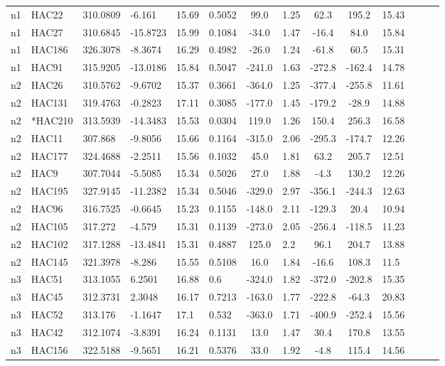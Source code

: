 \documentclass[useAMS,usenatbib]{mn2e}
\begin{document}
\begin{table*}
\begin{minipage}{150mm}
\begin{tabular}{@{}llllllclccllll@{}}
n1 & HAC22 & 310.0809 & -6.161 & 15.69 & 0.5052 & 99.0 & 1.25 & 62.3 & 195.2 & 15.43 \\
n1 & HAC27 & 310.6845 & -15.8723 & 15.99 & 0.1084 & -34.0 & 1.47 & -16.4 & 84.0 & 15.84 \\
n1 & HAC186 & 326.3078 & -8.3674 & 16.29 & 0.4982 & -26.0 & 1.24 & -61.8 & 60.5 & 15.31 \\
n1 & HAC91 & 315.9205 & -13.0186 & 15.84 & 0.5047 & -241.0 & 1.63 & -272.8 & -162.4 & 14.78 \\
n2 & HAC26 & 310.5762 & -9.6702 & 15.37 & 0.3661 & -364.0 & 1.25 & -377.4 & -255.8 & 11.61 \\
n2 & HAC131 & 319.4763 & -0.2823 & 17.11 & 0.3085 & -177.0 & 1.45 & -179.2 & -28.9 & 14.88 \\
n2 & *HAC210 & 313.5939 & -14.3483 & 15.53 & 0.0304 & 119.0 & 1.26 & 150.4 & 256.3 & 16.58 \\
n2 & HAC11 & 307.868 & -9.8056 & 15.66 & 0.1164 & -315.0 & 2.06 & -295.3 & -174.7 & 12.26 \\
n2 & HAC177 & 324.4688 & -2.2511 & 15.56 & 0.1032 & 45.0 & 1.81 & 63.2 & 205.7 & 12.51 \\
n2 & HAC9 & 307.7044 & -5.5085 & 15.34 & 0.5026 & 27.0 & 1.88 & -4.3 & 130.2 & 12.26 \\
n2 & HAC195 & 327.9145 & -11.2382 & 15.34 & 0.5046 & -329.0 & 2.97 & -356.1 & -244.3 & 12.63 \\
n2 & HAC96 & 316.7525 & -0.6645 & 15.23 & 0.1155 & -148.0 & 2.11 & -129.3 & 20.4 & 10.94 \\
n2 & HAC105 & 317.272 & -4.579 & 15.31 & 0.1139 & -273.0 & 2.05 & -256.4 & -118.5 & 11.23 \\
n2 & HAC102 & 317.1288 & -13.4841 & 15.31 & 0.4887 & 125.0 & 2.2 & 96.1 & 204.7 & 13.88 \\
n2 & HAC145 & 321.3978 & -8.286 & 15.55 & 0.5108 & 16.0 & 1.84 & -16.6 & 108.3 & 11.5 \\
n3 & HAC51 & 313.1055 & 6.2501 & 16.88 & 0.6 & -324.0 & 1.82 & -372.0 & -202.8 & 15.35 \\
n3 & HAC45 & 312.3731 & 2.3048 & 16.17 & 0.7213 & -163.0 & 1.77 & -222.8 & -64.3 & 20.83 \\
n3 & HAC52 & 313.176 & -1.1647 & 17.1 & 0.532 & -363.0 & 1.71 & -400.9 & -252.4 & 15.56 \\
n3 & HAC42 & 312.1074 & -3.8391 & 16.24 & 0.1131 & 13.0 & 1.47 & 30.4 & 170.8 & 13.55 \\
n3 & HAC156 & 322.5188 & -9.5651 & 16.21 & 0.5376 & 33.0 & 1.92 & -4.8 & 115.4 & 14.56 \\

\end{tabular}
\end{minipage}
\end{table*}
\end{document}
